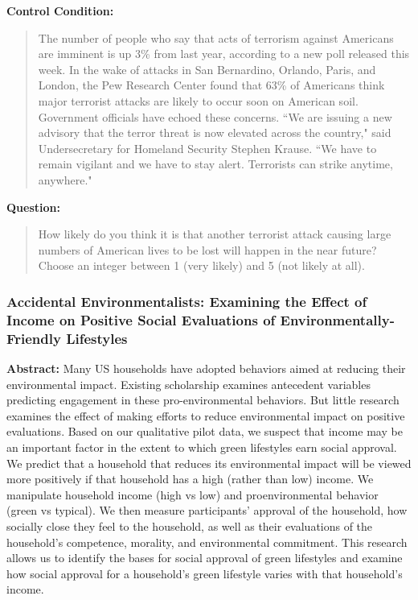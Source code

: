 \begin{tcolorbox}[
   title=Example Prompt,
   fonttitle=\bfseries,
   colback=white,
   colframe=pierCite,
   width=\textwidth,
   left=5pt,
   right=5pt
]
\textbf{Control Condition:}
\begin{quotation}
The number of people who say that acts of terrorism against Americans are imminent is up 3\% from last year, according to a new poll released this week. In the wake of attacks in San Bernardino, Orlando, Paris, and London, the Pew Research Center found that 63\% of Americans think major terrorist attacks are likely to occur soon on American soil. Government officials have echoed these concerns. ``We are issuing a new advisory that the terror threat is now elevated across the country," said Undersecretary for Homeland Security Stephen Krause. ``We have to remain vigilant and we have to stay alert. Terrorists can strike anytime, anywhere."
\end{quotation}

\textbf{Question:}
\begin{quotation}
How likely do you think it is that another terrorist attack causing large numbers of American lives to be lost will happen in the near future? Choose an integer between 1 (very likely) and 5 (not likely at all).
\end{quotation}
\end{tcolorbox}

\subsubsection{Accidental Environmentalists: Examining the Effect of Income on Positive Social Evaluations of Environmentally-Friendly Lifestyles~\citep{kennedy2020accidental}} 


\textbf{Abstract:} Many US households have adopted behaviors aimed at reducing their environmental impact. Existing scholarship examines antecedent variables predicting engagement in these pro-environmental behaviors. But little research examines the effect of making efforts to reduce environmental impact on positive evaluations. Based on our qualitative pilot data, we suspect that income may be an important factor in the extent to which green lifestyles earn social approval. We predict that a household that reduces its environmental impact will be viewed more positively if that household has a high (rather than low) income. We manipulate household income (high vs low) and proenvironmental behavior (green vs typical). We then measure participants' approval of the household, how socially close they feel to the household, as well as their evaluations of the household's competence, morality, and environmental commitment. This research allows us to identify the bases for social approval of green lifestyles and examine how social approval for a household's green lifestyle varies with that household's income.

